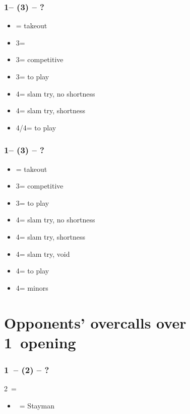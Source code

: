 \documentclass[12pt, a4paper]{report}
\begin{document}
\subsubsection*{1\spades -- (3\diams) -- ?}
\begin{itemize}
    \item \dbl = takeout
    \item 3\hearts = \hearts\ \gf
    \item 3\spades = competitive
    \item 3\nt = to play
    \item 4\clubs = slam try, no \diams shortness
    \item 4\diams = slam try, \diams shortness
    \item 4\hearts/4\spades = to play
\end{itemize}

\subsubsection*{1\spades -- (3\hearts) -- ?}
\begin{itemize}
    \item \dbl = takeout
    \item 3\spades = competitive
    \item 3\nt = to play
    \item 4\clubs = slam try, no \diams shortness
    \item 4\diams = slam try, \diams shortness
    \item 4\hearts = slam try, \hearts void
    \item 4\spades = to play
    \item 4\nt = minors
\end{itemize}

\section*{\colorbox{blue!30}{Opponents' overcalls over 1\ntx\ opening}}

\subsubsection*{1\ntx\ -- (2\clubs) -- ?}
2\clubs\ = \clubs
\begin{itemize}
    \item \dbl\ = Stayman
\end{itemize}
\end{document}
